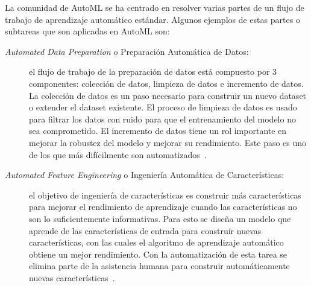 La comunidad de AutoML se ha centrado en resolver varias partes de un flujo de trabajo de aprendizaje automático estándar. Algunos ejemplos de estas partes o subtareas que son aplicadas en AutoML son:

\begin{description}
	\item[\textit{Automated Data Preparation} o Preparación Automática de Datos:] el flujo de trabajo de la preparación de datos está compuesto por 3 componentes: colección de datos, limpieza de datos e incremento de datos. La colección de datos es un paso necesario para construir un nuevo dataset o extender el dataset existente. El proceso de limpieza de datos es usado para filtrar los datos con ruido para que el entrenamiento del modelo no sea comprometido. El incremento de datos tiene un rol importante en mejorar la robustez del modelo y mejorar su rendimiento. Este paso es uno de los que más difícilmente son automatizados~\cite{he2021automl}.
	
	\item[\textit{Automated Feature Engineering} o Ingeniería Automática de Características:] el objetivo de ingeniería de características es construir más características para mejorar el rendimiento de aprendizaje cuando las características no son lo suficientemente informativas. Para esto se diseña un modelo que aprende de las características de entrada para construir nuevas características, con las cuales el algoritmo de aprendizaje automático obtiene un mejor rendimiento. Con la automatización de esta tarea se elimina parte de la asistencia humana para construir automáticamente nuevas características~\cite{he2021automl}.
	

	

\end{description}
